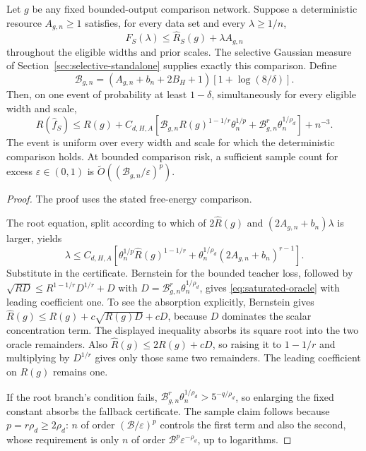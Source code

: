 \begin{corollary}
\label{cor:saturated-oracle}
Let $g$ be any fixed bounded-output comparison network. Suppose a deterministic resource $A_{g,n}\ge1$ satisfies, for every data set and every $\lambda\ge1/n$,
\[
 F_S(\lambda)\le\widehat R_S(g)+\lambda A_{g,n}
\]
throughout the eligible widths and prior scales. The selective Gaussian measure of Section~\ref{sec:selective-standalone} supplies exactly this comparison. Define
\[
 \mathcal B_{g,n}=(A_{g,n}+b_n+2B_H+1)[1+\log(8/\delta)].
\]
Then, on one event of probability at least $1-\delta$, simultaneously for every eligible width and scale,
\begin{equation}
 R(\widehat f_S)\le R(g)+C_{d,H,A}\left[
 \mathcal B_{g,n}R(g)^{1-1/r}\theta_n^{1/p}
 +\mathcal B_{g,n}^r\theta_n^{1/\rho_d}\right]+n^{-3}.
 \label{eq:saturated-oracle}
\end{equation}
The event is uniform over every width and scale for which the deterministic comparison holds. At bounded comparison risk, a sufficient sample count for excess $\varepsilon\in(0,1)$ is
$\widetilde O((\mathcal B_{g,n}/\varepsilon)^p)$.
\end{corollary}
\begin{proof}
The proof uses the stated free-energy comparison.

The root equation, split according to which of $2\widehat R(g)$ and $(2A_{g,n}+b_n)\lambda$ is larger, yields
\[
 \lambda\le C_{d,H,A}\left[
 \theta_n^{1/p}\widehat R(g)^{1-1/r}
 +\theta_n^{1/\rho_d}(2A_{g,n}+b_n)^{r-1}\right].
\]
Substitute in the certificate. Bernstein for the bounded teacher loss, followed by
$\sqrt{RD}\le R^{1-1/r}D^{1/r}+D$ with $D=\mathcal B_{g,n}^r\theta_n^{1/\rho_d}$, gives \eqref{eq:saturated-oracle} with leading coefficient one. To see the absorption explicitly, Bernstein gives $\widehat R(g)\le R(g)+c\sqrt{R(g)D}+cD$, because $D$ dominates the scalar concentration term. The displayed inequality absorbs its square root into the two oracle remainders. Also $\widehat R(g)\le2R(g)+cD$, so raising it to $1-1/r$ and multiplying by $D^{1/r}$ gives only those same two remainders. The leading coefficient on $R(g)$ remains one.

If the root branch's condition fails, $\mathcal B_{g,n}^r\theta_n^{1/\rho_d}>5^{-q/\rho_d}$, so enlarging the fixed constant absorbs the fallback certificate. The sample claim follows because $p=r\rho_d\ge2\rho_d$: $n$ of order $(\mathcal B/\varepsilon)^p$ controls the first term and also the second, whose requirement is only $n$ of order $\mathcal B^p\varepsilon^{-\rho_d}$, up to logarithms.
\end{proof}
